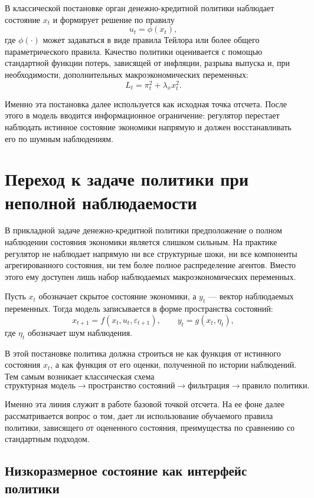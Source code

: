 \documentclass[12pt,a4paper]{article}
\begin{document}
В классической постановке орган денежно-кредитной политики наблюдает состояние $x_t$ и формирует решение по правилу
\[
u_t=\phi(x_t),
\]
где $\phi(\cdot)$ может задаваться в виде правила Тейлора или более общего параметрического правила. Качество политики оценивается с помощью стандартной функции потерь, зависящей от инфляции, разрыва выпуска и, при необходимости, дополнительных макроэкономических переменных:
\[
L_t=\pi_t^2+\lambda_x x_t^2.
\]

Именно эта постановка далее используется как исходная точка отсчета. После этого в модель вводится информационное ограничение: регулятор перестает наблюдать истинное состояние экономики напрямую и должен восстанавливать его по шумным наблюдениям.

\section{Переход к задаче политики при неполной наблюдаемости}

В прикладной задаче денежно-кредитной политики предположение о полном наблюдении состояния экономики является слишком сильным. На практике регулятор не наблюдает напрямую ни все структурные шоки, ни все компоненты агрегированного состояния, ни тем более полное распределение агентов. Вместо этого ему доступен лишь набор наблюдаемых макроэкономических переменных.

Пусть $x_t$ обозначает скрытое состояние экономики, а $y_t$ --- вектор наблюдаемых переменных. Тогда модель записывается в форме пространства состояний:
\[
x_{t+1}=f(x_t,u_t,\varepsilon_{t+1}), \qquad
y_t=g(x_t,\eta_t),
\]
где $\eta_t$ обозначает шум наблюдения.

В этой постановке политика должна строиться не как функция от истинного состояния $x_t$, а как функция от его оценки, полученной по истории наблюдений. Тем самым возникает классическая схема
\[
\text{структурная модель} \rightarrow \text{пространство состояний} \rightarrow \text{фильтрация} \rightarrow \text{правило политики}.
\]

Именно эта линия служит в работе базовой точкой отсчета. На ее фоне далее рассматривается вопрос о том, дает ли использование обучаемого правила политики, зависящего от оцененного состояния, преимущества по сравнению со стандартным подходом.

\subsection{Низкоразмерное состояние как интерфейс политики}
\end{document}
